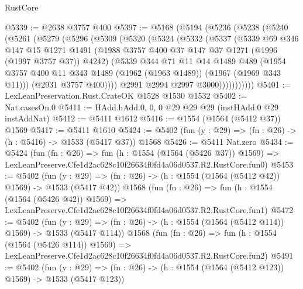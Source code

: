 \begin{lexlean}{RustCore}
\begin{coremodule}
@5339 := @2638 @3757 @400
@5397 := @5168
    (@5194
      (@5236
        (@5238
          (@5240
            (@5261
              (@5279
                (@5296
                  (@5309
                    (@5320
                      (@5324
                        (@5332
                          (@5337
                            (@5339
                              @69
                              @346
                              @147
                              @15
                              @1271
                              @1491
                              (@1988 @3757 @400 @37 @147 @37 @1271 (@1996 (@1997 @3757 @37)) @4242)
                              (@5339
                                @344
                                @71
                                @11
                                @14
                                @1489
                                @489
                                (@1954
                                  @3757
                                  @400
                                  @11
                                  @343
                                  @1489
                                  (@1962 (@1963 @1489))
                                  (@1967 (@1969 @343 @11)))
                                (@2931 @3757 @400))))
                          @2991
                          @2994
                          @2997
                          @3000)))))))))))
@5401 := LexLeanPreservation.Rust.CrateOK @1528 @1530 @1532
@5402 := Nat.casesOn.{0}
@5411 := HAdd.hAdd.{0, 0, 0} @29 @29 @29 (instHAdd.{0} @29 instAddNat)
@5412 := @5411 @1612
@5416 := @1554 (@1564 (@5412 @37)) @1569
@5417 := @5411 @1610
@5424 := @5402 (fun (y : @29) => (fn : @26) -> (h : @5416) -> @1533 (@5417 @37)) @1568
@5426 := @5411 Nat.zero
@5434 := @5424
    (fun (fn : @26) =>
    fun (h : @1554 (@1564 (@5426 @37)) @1569) =>
    LexLeanPreserve.Cfe1d2ac628c10f26634f0fd4a06d0537.R2.RustCore.fun0)
@5453 := @5402
    (fun (y : @29) => (fn : @26) -> (h : @1554 (@1564 (@5412 @42)) @1569) -> @1533 (@5417 @42))
    @1568
    (fun (fn : @26) =>
    fun (h : @1554 (@1564 (@5426 @42)) @1569) =>
    LexLeanPreserve.Cfe1d2ac628c10f26634f0fd4a06d0537.R2.RustCore.fun1)
@5472 := @5402
    (fun (y : @29) => (fn : @26) -> (h : @1554 (@1564 (@5412 @114)) @1569) -> @1533 (@5417 @114))
    @1568
    (fun (fn : @26) =>
    fun (h : @1554 (@1564 (@5426 @114)) @1569) =>
    LexLeanPreserve.Cfe1d2ac628c10f26634f0fd4a06d0537.R2.RustCore.fun2)
@5491 := @5402
    (fun (y : @29) => (fn : @26) -> (h : @1554 (@1564 (@5412 @123)) @1569) -> @1533 (@5417 @123))

\end{coremodule}
\end{lexlean}

